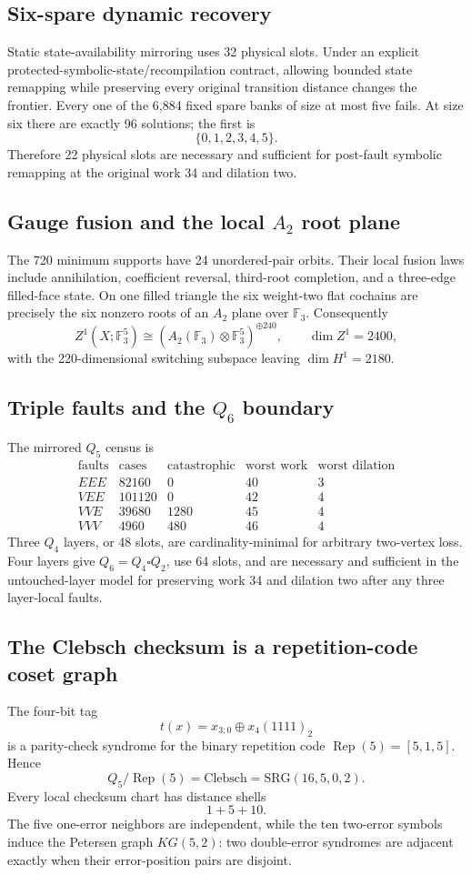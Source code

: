 \subsection{Six-spare dynamic recovery}
Static state-availability mirroring uses 32 physical slots.  Under an explicit protected-symbolic-state/recompilation contract, allowing bounded state remapping while
preserving every original transition distance changes the frontier.  Every one
of the 6,884 fixed spare banks of size at most five fails.  At size six there
are exactly 96 solutions; the first is
\[
 \boxed{\{0,1,2,3,4,5\}}.
\]
Therefore 22 physical slots are necessary and sufficient for post-fault symbolic remapping at the original work 34 and dilation two.

\subsection{Gauge fusion and the local \(A_2\) root plane}
The 720 minimum supports have 24 unordered-pair orbits.  Their local fusion laws
include annihilation, coefficient reversal, third-root completion, and a
three-edge filled-face state.  On one filled triangle the six weight-two flat
cochains are precisely the six nonzero roots of an \(A_2\) plane over
\(\mathbb F_3\).  Consequently
\[
 Z^1(X;\mathbb F_3^5)
 \cong
 \left(A_2(\mathbb F_3)\otimes\mathbb F_3^5\right)^{\oplus240},
 \qquad \dim Z^1=2400,
\]
with the 220-dimensional switching subspace leaving
\(\dim H^1=2180\).

\subsection{Triple faults and the \(Q_6\) boundary}
The mirrored \(Q_5\) census is
\[
\begin{array}{c|r|r|r|r}
\text{faults}&\text{cases}&\text{catastrophic}&\text{worst work}&\text{worst dilation}\\\hline
EEE&82160&0&40&3\\
VEE&101120&0&42&4\\
VVE&39680&1280&45&4\\
VVV&4960&480&46&4
\end{array}
\]
Three \(Q_4\) layers, or 48 slots, are cardinality-minimal for arbitrary
two-vertex loss.  Four layers give \(Q_6=Q_4\square Q_2\), use 64 slots, and
are necessary and sufficient in the untouched-layer model for preserving work
34 and dilation two after any three layer-local faults.

\subsection{The Clebsch checksum is a repetition-code coset graph}
The four-bit tag
\[
 t(x)=x_{3:0}\oplus x_4(1111)_2
\]
is a parity-check syndrome for the binary repetition code
\(\operatorname{Rep}(5)=[5,1,5]\).  Hence
\[
 \boxed{Q_5/\operatorname{Rep}(5)=\mathrm{Clebsch}=\mathrm{SRG}(16,5,0,2)}.
\]
Every local checksum chart has distance shells
\[
 \boxed{1+5+10}.
\]
The five one-error neighbors are independent, while the ten two-error symbols
induce the Petersen graph \(KG(5,2)\): two double-error syndromes are adjacent
exactly when their error-position pairs are disjoint.

